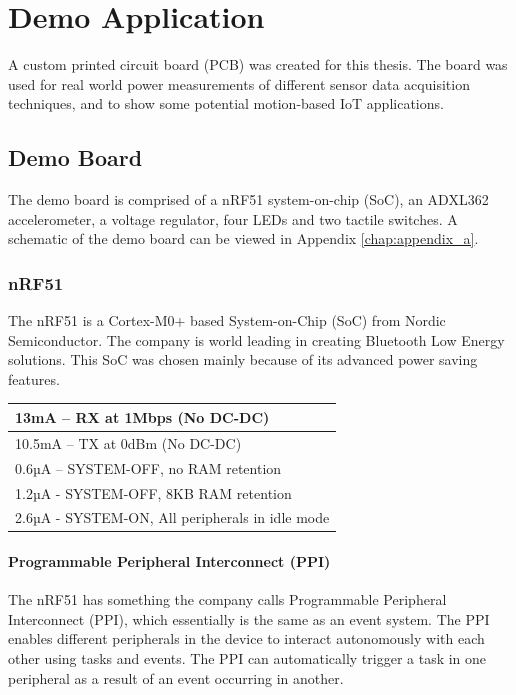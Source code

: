 \chapter{Demo Application}

A custom printed circuit board (PCB) was created for this thesis. The board was used for real world power measurements of different sensor data acquisition techniques, and to show some potential motion-based IoT applications. 

\section{Demo Board}

The demo board is comprised of a nRF51 system-on-chip (SoC), an ADXL362 accelerometer, a voltage regulator, four LEDs and two tactile switches. A schematic of the demo board can be viewed in Appendix \ref{chap:appendix_a}. 

\subsection{nRF51}

The nRF51 is a Cortex-M0+ based System-on-Chip (SoC) from Nordic Semiconductor. The company is world leading in creating Bluetooth Low Energy solutions. This SoC was chosen mainly because of its advanced power saving features. 

\begin{center}
    \begin{tabular}{| l |}
    \hline
    13mA – RX at 1Mbps (No DC-DC) \\ \hline
    10.5mA – TX at 0dBm (No DC-DC) \\ \hline
    0.6µA – SYSTEM-OFF, no RAM retention \\ \hline
    1.2µA - SYSTEM-OFF, 8KB RAM retention \\ \hline
    2.6µA - SYSTEM-ON, All peripherals in idle mode \\ \hline
    \end{tabular}
\end{center}

\subsubsection{Programmable Peripheral Interconnect (PPI)}

The nRF51 has something the company calls Programmable Peripheral Interconnect (PPI), which essentially is the same as an event system. The PPI enables different peripherals in the device to interact autonomously with each other using tasks and events. The PPI can automatically trigger a task in one peripheral as a result of an event occurring in another. 

